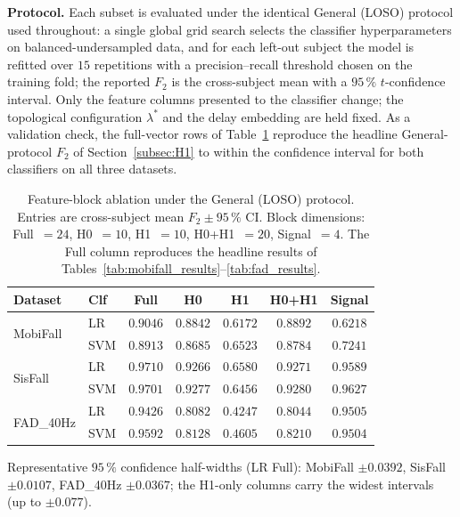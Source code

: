 \textbf{Protocol.}  Each subset is evaluated under the identical General (LOSO)
protocol used throughout: a single global grid search selects the classifier
hyperparameters on balanced-undersampled data, and for each left-out subject the model
is refitted over $15$ repetitions with a precision--recall threshold chosen on the
training fold; the reported $F_2$ is the cross-subject mean with a $95\,\%$ $t$-confidence
interval.  Only the feature columns presented to the classifier change; the topological
configuration $\lambda^*$ and the delay embedding are held fixed.  As a validation
check, the full-vector rows of Table~\ref{tab:ablation_blocks} reproduce the headline
General-protocol $F_2$ of Section~\ref{subsec:H1} to within the confidence interval for
both classifiers on all three datasets.

\begin{table}[h!]
\centering
\caption{Feature-block ablation under the General (LOSO) protocol.  Entries are
  cross-subject mean $F_2 \pm 95\,\%$ CI.  Block dimensions: Full~$=24$, H0~$=10$,
  H1~$=10$, H0+H1~$=20$, Signal~$=4$.  The Full column reproduces the headline results
  of Tables~\ref{tab:mobifall_results}--\ref{tab:fad_results}.}
\label{tab:ablation_blocks}
\setlength{\tabcolsep}{3.5pt}\footnotesize
\begin{tabular}{llccccc}
\toprule
\textbf{Dataset} & \textbf{Clf}
  & \textbf{Full} & \textbf{H0} & \textbf{H1} & \textbf{H0+H1} & \textbf{Signal} \\
\midrule
\multirow{2}{*}{MobiFall}
 & LR  & $\mathbf{0.9046}$ & $0.8842$ & $0.6172$ & $0.8892$ & $0.6218$ \\
 & SVM & $\mathbf{0.8913}$ & $0.8685$ & $0.6523$ & $0.8784$ & $0.7241$ \\
\midrule
\multirow{2}{*}{SisFall}
 & LR  & $\mathbf{0.9710}$ & $0.9266$ & $0.6580$ & $0.9271$ & $0.9589$ \\
 & SVM & $\mathbf{0.9701}$ & $0.9277$ & $0.6456$ & $0.9280$ & $0.9627$ \\
\midrule
\multirow{2}{*}{FAD\_40Hz}
 & LR  & $\mathbf{0.9426}$ & $0.8082$ & $0.4247$ & $0.8044$ & $0.9505$ \\
 & SVM & $\mathbf{0.9592}$ & $0.8128$ & $0.4605$ & $0.8210$ & $0.9504$ \\
\bottomrule
\end{tabular}

\vspace{2pt}
{\footnotesize Representative $95\,\%$ confidence half-widths (LR Full):
MobiFall $\pm0.0392$, SisFall $\pm0.0107$, FAD\_40Hz $\pm0.0367$; the H1-only columns
carry the widest intervals (up to $\pm0.077$).}
\end{table}

